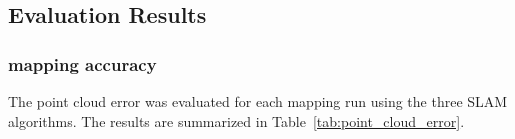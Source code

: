\documentclass[conference]{IEEEtran}
\begin{document}

\subsection{Evaluation Results}\label{AAA}
\subsubsection{mapping accuracy}
The point cloud error was evaluated for each mapping run using the three SLAM algorithms. 
The results are summarized in Table~\ref{tab:point_cloud_error}.
\end{document}

